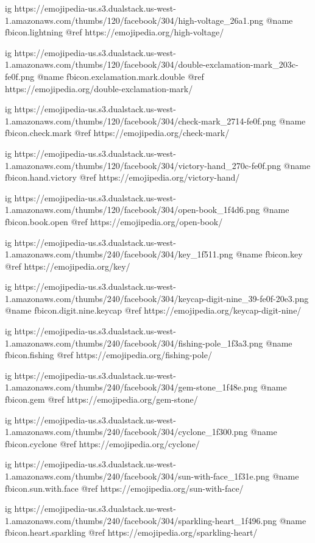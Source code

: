  ig https://emojipedia-us.s3.dualstack.us-west-1.amazonaws.com/thumbs/120/facebook/304/high-voltage_26a1.png
  @name fbicon.lightning
  @ref https://emojipedia.org/high-voltage/

  ig https://emojipedia-us.s3.dualstack.us-west-1.amazonaws.com/thumbs/120/facebook/304/double-exclamation-mark_203c-fe0f.png
  @name fbicon.exclamation.mark.double
  @ref https://emojipedia.org/double-exclamation-mark/

  ig https://emojipedia-us.s3.dualstack.us-west-1.amazonaws.com/thumbs/120/facebook/304/check-mark_2714-fe0f.png
  @name fbicon.check.mark
  @ref https://emojipedia.org/check-mark/

  ig https://emojipedia-us.s3.dualstack.us-west-1.amazonaws.com/thumbs/120/facebook/304/victory-hand_270c-fe0f.png
  @name fbicon.hand.victory
  @ref https://emojipedia.org/victory-hand/

  ig https://emojipedia-us.s3.dualstack.us-west-1.amazonaws.com/thumbs/120/facebook/304/open-book_1f4d6.png
  @name fbicon.book.open
  @ref https://emojipedia.org/open-book/

  ig https://emojipedia-us.s3.dualstack.us-west-1.amazonaws.com/thumbs/240/facebook/304/key_1f511.png
  @name fbicon.key
  @ref https://emojipedia.org/key/


  ig https://emojipedia-us.s3.dualstack.us-west-1.amazonaws.com/thumbs/240/facebook/304/keycap-digit-nine_39-fe0f-20e3.png
  @name fbicon.digit.nine.keycap
  @ref https://emojipedia.org/keycap-digit-nine/

  ig https://emojipedia-us.s3.dualstack.us-west-1.amazonaws.com/thumbs/240/facebook/304/fishing-pole_1f3a3.png
  @name fbicon.fishing
  @ref https://emojipedia.org/fishing-pole/

  ig https://emojipedia-us.s3.dualstack.us-west-1.amazonaws.com/thumbs/240/facebook/304/gem-stone_1f48e.png
  @name fbicon.gem
  @ref https://emojipedia.org/gem-stone/

  ig https://emojipedia-us.s3.dualstack.us-west-1.amazonaws.com/thumbs/240/facebook/304/cyclone_1f300.png
  @name fbicon.cyclone
  @ref https://emojipedia.org/cyclone/

  ig https://emojipedia-us.s3.dualstack.us-west-1.amazonaws.com/thumbs/240/facebook/304/sun-with-face_1f31e.png
  @name fbicon.sun.with.face
  @ref https://emojipedia.org/sun-with-face/

  ig https://emojipedia-us.s3.dualstack.us-west-1.amazonaws.com/thumbs/240/facebook/304/sparkling-heart_1f496.png
  @name fbicon.heart.sparkling
  @ref https://emojipedia.org/sparkling-heart/

